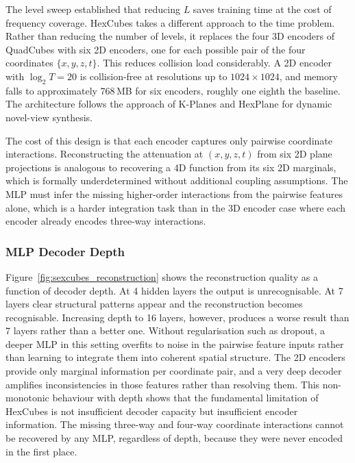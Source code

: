 \documentclass[12pt, a4paper, twoside]{report}
\begin{document}
The level sweep established that reducing $L$ saves training time at the cost of frequency coverage. HexCubes takes a different approach to the time problem. Rather than reducing the number of levels, it replaces the four 3D encoders of QuadCubes with six 2D encoders, one for each possible pair of the four coordinates $\{x, y, z, t\}$. This reduces collision load considerably. A 2D encoder with $\log_2 T = 20$ is collision-free at resolutions up to $1024 \times 1024$, and memory falls to approximately 768\,MB for six encoders, roughly one eighth the baseline. The architecture follows the approach of K-Planes \citep{fridovichkeil2023kplanes} and HexPlane \citep{cao2023hexplane} for dynamic novel-view synthesis.

The cost of this design is that each encoder captures only pairwise coordinate interactions. Reconstructing the attenuation at $(x, y, z, t)$ from six 2D plane projections is analogous to recovering a 4D function from its six 2D marginals, which is formally underdetermined without additional coupling assumptions. The MLP must infer the missing higher-order interactions from the pairwise features alone, which is a harder integration task than in the 3D encoder case where each encoder already encodes three-way interactions.

\subsubsection{MLP Decoder Depth}

Figure~\ref{fig:sexcubes_reconstruction} shows the reconstruction quality as a function of decoder depth. At 4 hidden layers the output is unrecognisable. At 7 layers clear structural patterns appear and the reconstruction becomes recognisable. Increasing depth to 16 layers, however, produces a worse result than 7 layers rather than a better one. Without regularisation such as dropout, a deeper MLP in this setting overfits to noise in the pairwise feature inputs rather than learning to integrate them into coherent spatial structure. The 2D encoders provide only marginal information per coordinate pair, and a very deep decoder amplifies inconsistencies in those features rather than resolving them. This non-monotonic behaviour with depth shows that the fundamental limitation of HexCubes is not insufficient decoder capacity but insufficient encoder information. The missing three-way and four-way coordinate interactions cannot be recovered by any MLP, regardless of depth, because they were never encoded in the first place.
\end{document}

